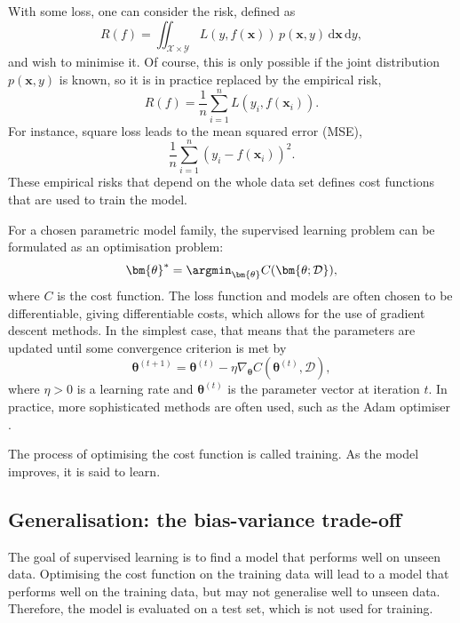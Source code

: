 With some loss, one can consider the risk, defined as
\begin{equation}
    R(f) = \iint_{\mathcal{X}\times\mathcal{Y}} L(y, f(\bm{x})) \, p(\bm{x}, y) \, \mathrm{d}\bm{x} \, \mathrm{d}y,
    \label{eq:risk}
\end{equation}
and wish to minimise it.
Of course, this is only possible if the joint distribution $p(\bm{x}, y)$ is known, so it is in practice replaced by the empirical risk,
\begin{equation}
    R(f) = \frac{1}{n} \sum_{i=1}^n L(y_i, f(\bm{x}_i)).
    \label{eq:empirical_risk}
\end{equation}
For instance, square loss leads to the mean squared error (MSE),
\begin{equation}
    \frac{1}{n} \sum_{i=1}^n (y_i - f(\bm{x}_i))^2.
\end{equation}
These empirical risks that depend on the whole data set defines cost functions that are used to train the model.

For a chosen parametric model family, the supervised learning problem can be formulated as an optimisation problem:
\begin{equation}
    \bm{\theta}^* = \argmin_{\bm{\theta}} C(\bm{\theta; \mathcal{D}}),
\end{equation}
where $C$ is the cost function.
The loss function and models are often chosen to be differentiable, giving differentiable costs, which allows for the use of gradient descent methods.
In the simplest case, that means that the parameters are updated until some convergence criterion is met by
\begin{equation}
    \bm{\theta}^{(t+1)} = \bm{\theta}^{(t)} - \eta \nabla_{\bm{\theta}} C(\bm{\theta}^{(t)}, \mathcal{D}),
\end{equation}
where $\eta>0$ is a learning rate and $\bm{\theta}^{(t)}$ is the parameter vector at iteration $t$.
In practice, more sophisticated methods are often used, such as the Adam optimiser \cite{adamoptimiser}.

The process of optimising the cost function is called training.
As the model improves, it is said to learn.

\subsection{Generalisation: the bias-variance trade-off}
The goal of supervised learning is to find a model that performs well on unseen data.
Optimising the cost function on the training data will lead to a model that performs well on the training data, but may not generalise well to unseen data.
Therefore, the model is evaluated on a test set, which is not used for training.

